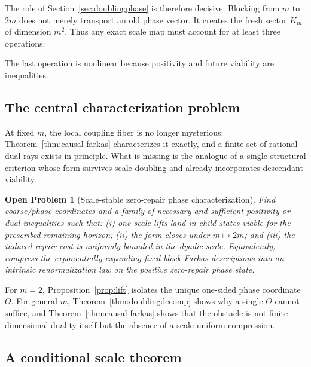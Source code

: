 \documentclass[11pt,a4paper]{article}
\newtheorem{problem}[theorem]{Open Problem}
\theoremstyle{definition}
\theoremstyle{remark}
\begin{document}
The role of Section~\ref{sec:doublingphase} is therefore decisive.  Blocking from $m$
to $2m$ does not merely transport an old phase vector.  It creates the fresh
sector $K_m$ of dimension $m^2$.  Thus any exact scale map must account for at
least three operations:
\begin{center}
\end{center}
The last operation is nonlinear because positivity and future viability are
inequalities.

\subsection{The central characterization problem}

At fixed \(m\), the local coupling fiber is no longer mysterious:
Theorem~\ref{thm:causal-farkas} characterizes it exactly, and a finite set of
rational dual rays exists in principle.  What is missing is the analogue of a
single structural criterion whose form survives scale doubling and already
incorporates descendant viability.

\begin{problem}[Scale-stable zero-repair phase characterization]
\label{prob:phasecharacterization}
Find coarse/phase coordinates and a family of necessary-and-sufficient
positivity or dual inequalities such that: (i) one-scale lifts land in child
states viable for the prescribed remaining horizon; (ii) the form closes under
\(m\mapsto2m\); and (iii) the induced repair cost is uniformly bounded in the
dyadic scale.  Equivalently, compress the exponentially expanding fixed-block
Farkas descriptions into an intrinsic renormalization law on the positive
zero-repair phase state.
\end{problem}

For \(m=2\), Proposition~\ref{prop:lift} isolates the unique one-sided phase
coordinate \(\Theta\).  For general \(m\),
Theorem~\ref{thm:doublingdecomp} shows why a single \(\Theta\) cannot suffice,
and Theorem~\ref{thm:causal-farkas} shows that the obstacle is not
finite-dimensional duality itself but the absence of a scale-uniform
compression.

\subsection{A conditional scale theorem}
\end{document}
